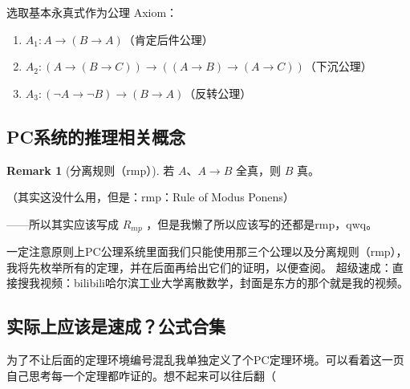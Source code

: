 \documentclass[oneside]{book}
\theoremstyle{definition}
\newtheorem{remark}{Remark}[section]
\begin{document}
选取基本永真式作为公理 Axiom：
\begin{enumerate}
	\item \( A_1: A \to (B \to A) \)（肯定后件公理）
	\item \( A_2: (A \to (B \to C)) \to ((A \to B) \to (A \to C)) \)（下沉公理）
	\item \( A_3: (\neg A \to \neg B) \to (B \to A) \)（反转公理）
\end{enumerate}
\subsection{PC系统的推理相关概念}

\begin{remark}[分离规则（rmp）]
	若 \( A \)、\( A \to B \) 全真，则 \( B \) 真。
\end{remark}
（其实这没什么用，但是：rmp：Rule of Modus Ponens）

\hfill ——所以其实应该写成 \(R_{mp}\) ，但是我懒了所以应该写的还都是rmp，qwq。

一定注意原则上PC公理系统里面我们只能使用那三个公理以及分离规则（rmp），我将先枚举所有的定理，并在后面再给出它们的证明，以便查阅。
超级速成：直接搜我视频：bilibili哈尔滨工业大学离散数学，封面是东方的那个就是我的视频。

\subsection{实际上应该是速成？公式合集}
为了不让后面的定理环境编号混乱我单独定义了个PC定理环境。可以看着这一页自己思考每一个定理都咋证的。想不起来可以往后翻（
\end{document}
